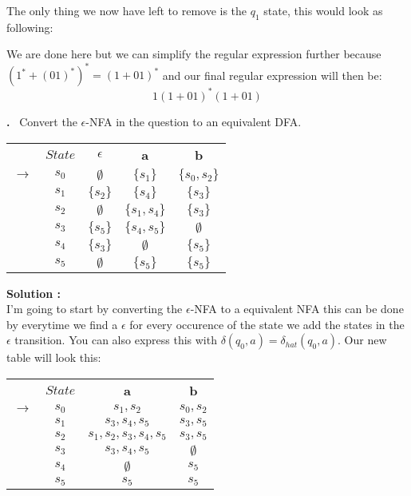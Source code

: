 \documentclass{article}
\newcounter{problem}
\newcounter{solution}
\newcommand\Problem{%
  \stepcounter{problem}%
  \textbf{\theproblem.}~%
  \setcounter{solution}{0}%
}
\newcommand\TheSolution{%
  \textbf{Solution \theproblem:}\\%
}
\begin{document}
The only thing we now have left to remove is the $q_1$ state, this would look as following:

\begin{center}
\end{center}

We are done here but we can simplify the regular expression further because $(1^*+(01)^*)^* = (1+01)^*$
and our final regular expression will then be: 
\[1(1+01)^*(1+01)\]
\newpage

\Problem Convert the $\epsilon$-NFA in the question to an equivalent DFA.

\begin{table}[h!]
  \centering
  \begin{tabular}{c c c c c}
    &\textbf{$State$}& $\epsilon$ &\textbf{a}&\textbf{b}\\
    $\to$        & $s_0$ & $\emptyset$ & $\{s_1\}$ & $\{s_0,s_2\}$\\
    \hfill       & $s_1$ & $\{s_2\}$ & $\{s_4\}$ & $\{s_3\}$\\
    \hfill       & $s_2$ & $\emptyset$ & $\{s_1,s_4\}$ & $\{s_3\}$\\
    \hfill       & $s_3$ & $\{s_5\}$ & $\{s_4,s_5\}$ & $\emptyset$\\
    \hfill       & $s_4$ & $\{s_3\}$ & $\emptyset$ & $\{s_5\}$\\
    \hfill     * & $s_5$ & $\emptyset$ & $\{s_5\}$ & $\{s_5\}$\\
  \end{tabular}
\end{table}

\TheSolution I'm going to start by converting the $\epsilon$-NFA to a equivalent NFA this can be
done by everytime we find a $\epsilon$ for every occurence of the state we add the states in the $\epsilon$
transition. You can also express this with $\delta (q_0, a) = \delta_{hat} (q_0, a)$. Our new table will look 
this:

\begin{table}[h!]
  \centering
  \begin{tabular}{c c c c}
    &\textbf{$State$}&\textbf{a}&\textbf{b} \\
    $\to$    & $s_0$ & $s_1,s_2$ & $s_0,s_2$ \\
             & $s_1$ & $s_3,s_4,s_5$ & $s_3,s_5$ \\
             & $s_2$ & $s_1,s_2,s_3,s_4,s_5$ & $s_3,s_5$ \\
             & $s_3$ & $s_3,s_4,s_5$ & $\emptyset$ \\
             & $s_4$ & $\emptyset$ & $s_5$ \\
    \hfill * & $s_5$ & $s_5$ & $s_5$ \\ [0.5ex]
  \end{tabular}
\end{table}
\end{document}
